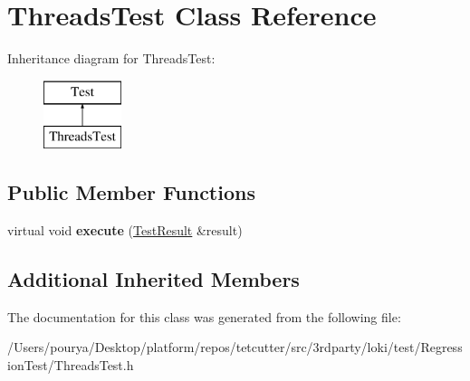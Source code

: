 \hypertarget{classThreadsTest}{}\section{Threads\+Test Class Reference}
\label{classThreadsTest}
Inheritance diagram for Threads\+Test\+:\begin{figure}[H]
\begin{center}
\leavevmode
\includegraphics[height=2.000000cm]{classThreadsTest}
\end{center}
\end{figure}
\subsection*{Public Member Functions}
\begin{DoxyCompactItemize}
\item 
\hypertarget{classThreadsTest_a6c3b44a476c40db5e15264006fa0fe07}{}virtual void {\bfseries execute} (\hyperlink{classTestResult}{Test\+Result} \&result)\label{classThreadsTest_a6c3b44a476c40db5e15264006fa0fe07}

\end{DoxyCompactItemize}
\subsection*{Additional Inherited Members}


The documentation for this class was generated from the following file\+:\begin{DoxyCompactItemize}
\item 
/\+Users/pourya/\+Desktop/platform/repos/tetcutter/src/3rdparty/loki/test/\+Regression\+Test/Threads\+Test.\+h\end{DoxyCompactItemize}
